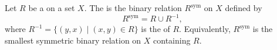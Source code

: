 \begin{definition} \label{definition:symmetric_closure_of_a_binary_relation_on_a_set}
Let $R$ be a  on a set $X$. The  is the binary relation $R^{\mathrm{sym}}$ on $X$ defined by
$$
R^{\mathrm{sym}} = R \cup R^{-1},
$$
where $R^{-1} = \{ (y, x) \mid (x, y) \in R \}$ is the  of $R$. Equivalently, $R^{\mathrm{sym}}$ is the smallest symmetric binary relation on $X$ containing $R$.
\end{definition}